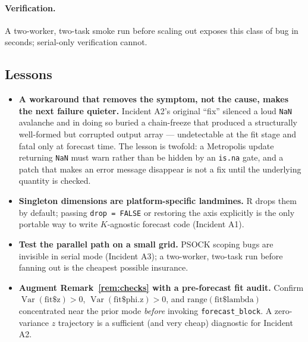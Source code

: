 \documentclass[11pt]{article}
\theoremstyle{definition}
\theoremstyle{remark}
\newcommand{\Var}{\operatorname{Var}}
\begin{document}
\paragraph{Verification.}
A two-worker, two-task smoke run before scaling out exposes this
class of bug in seconds; serial-only verification cannot.

\subsection{Lessons}

\begin{itemize}[leftmargin=1.4em]
  \item \textbf{A workaround that removes the symptom, not the cause,
        makes the next failure quieter.} Incident A2's original
        ``fix'' silenced a loud \texttt{NaN} avalanche and in doing so
        buried a chain-freeze that produced a structurally well-formed
        but corrupted output array --- undetectable at the fit stage and
        fatal only at forecast time. The lesson is twofold: a Metropolis
        update returning \texttt{NaN} must warn rather than be hidden by
        an \texttt{is.na} gate, and a patch that makes an error message
        disappear is not a fix until the underlying quantity is checked.
  \item \textbf{Singleton dimensions are platform-specific landmines.}
        R drops them by default; passing \texttt{drop = FALSE} or
        restoring the axis explicitly is the only portable way to
        write $K$-agnostic forecast code (Incident A1).
  \item \textbf{Test the parallel path on a small grid.} PSOCK
        scoping bugs are invisible in serial mode (Incident A3); a
        two-worker, two-task run before fanning out is the cheapest
        possible insurance.
  \item \textbf{Augment Remark~\ref{rem:checks} with a pre-forecast
        fit audit.} Confirm
        $\Var(\mathrm{fit\$z}) > 0$,
        $\Var(\mathrm{fit\$phi.z}) > 0$, and
        $\mathrm{range}(\mathrm{fit\$lambda})$ concentrated near the
        prior mode \emph{before} invoking \texttt{forecast\_block}.
        A zero-variance $z$ trajectory is a sufficient (and very
        cheap) diagnostic for Incident A2.
\end{itemize}
\end{document}
